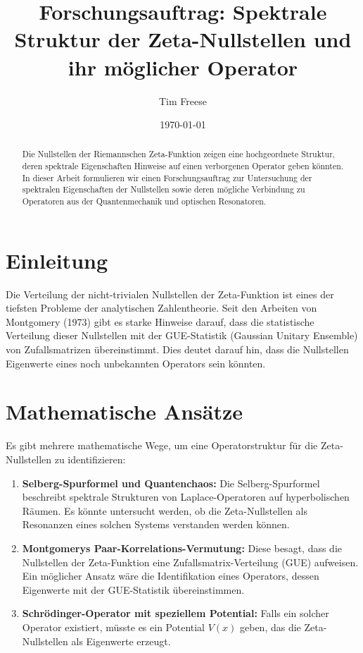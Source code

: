\documentclass[a4paper,12pt]{article}
\title{Forschungsauftrag: Spektrale Struktur der Zeta-Nullstellen und ihr möglicher Operator}
\author{Tim Freese}
\date{\today}
\begin{document}
\maketitle

\begin{abstract}
Die Nullstellen der Riemannschen Zeta-Funktion zeigen eine hochgeordnete Struktur, deren spektrale Eigenschaften Hinweise auf einen verborgenen Operator geben könnten. In dieser Arbeit formulieren wir einen Forschungsauftrag zur Untersuchung der spektralen Eigenschaften der Nullstellen sowie deren mögliche Verbindung zu Operatoren aus der Quantenmechanik und optischen Resonatoren.
\end{abstract}

\section{Einleitung}
Die Verteilung der nicht-trivialen Nullstellen der Zeta-Funktion ist eines der tiefsten Probleme der analytischen Zahlentheorie. Seit den Arbeiten von Montgomery (1973) gibt es starke Hinweise darauf, dass die statistische Verteilung dieser Nullstellen mit der GUE-Statistik (Gaussian Unitary Ensemble) von Zufallsmatrizen übereinstimmt. Dies deutet darauf hin, dass die Nullstellen Eigenwerte eines noch unbekannten Operators sein könnten.

\section{Mathematische Ansätze}
Es gibt mehrere mathematische Wege, um eine Operatorstruktur für die Zeta-Nullstellen zu identifizieren:
\begin{enumerate}
    \item \textbf{Selberg-Spurformel und Quantenchaos:} Die Selberg-Spurformel beschreibt spektrale Strukturen von Laplace-Operatoren auf hyperbolischen Räumen. Es könnte untersucht werden, ob die Zeta-Nullstellen als Resonanzen eines solchen Systems verstanden werden können.
    \item \textbf{Montgomerys Paar-Korrelations-Vermutung:} Diese besagt, dass die Nullstellen der Zeta-Funktion eine Zufallsmatrix-Verteilung (GUE) aufweisen. Ein möglicher Ansatz wäre die Identifikation eines Operators, dessen Eigenwerte mit der GUE-Statistik übereinstimmen.
    \item \textbf{Schrödinger-Operator mit speziellem Potential:} Falls ein solcher Operator existiert, müsste es ein Potential \(V(x)\) geben, das die Zeta-Nullstellen als Eigenwerte erzeugt.
\end{enumerate}
\end{document}
